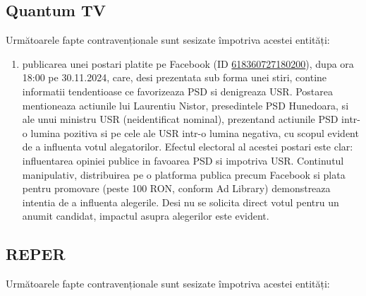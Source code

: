 \documentclass[a4paper,12pt]{article}
\begin{document}
\vspace{0.5cm}

\subsection{Quantum TV}
Următoarele fapte contravenționale sunt sesizate împotriva acestei entități:

\begin{enumerate}[leftmargin=*, label=\arabic*.)]
    \item publicarea unei postari platite pe Facebook (ID \href{https://www.facebook.com/ads/library/?id=618360727180200}{618360727180200}), dupa ora 18:00 pe 30.11.2024, care, desi prezentata sub forma unei stiri, contine informatii tendentioase ce favorizeaza PSD si denigreaza USR. Postarea mentioneaza actiunile lui Laurentiu Nistor, presedintele PSD Hunedoara, si ale unui ministru USR (neidentificat nominal), prezentand actiunile PSD intr-o lumina pozitiva si pe cele ale USR intr-o lumina negativa, cu scopul evident de a influenta votul alegatorilor.  Efectul electoral al acestei postari este clar: influentarea opiniei publice in favoarea PSD si impotriva USR.  Continutul manipulativ, distribuirea pe o platforma publica precum Facebook si plata pentru promovare (peste 100 RON, conform Ad Library) demonstreaza intentia de a influenta alegerile.  Desi nu se solicita direct votul pentru un anumit candidat, impactul asupra alegerilor este evident.
\end{enumerate}

\vspace{0.5cm}

\subsection{REPER}
Următoarele fapte contravenționale sunt sesizate împotriva acestei entități:
\end{document}
